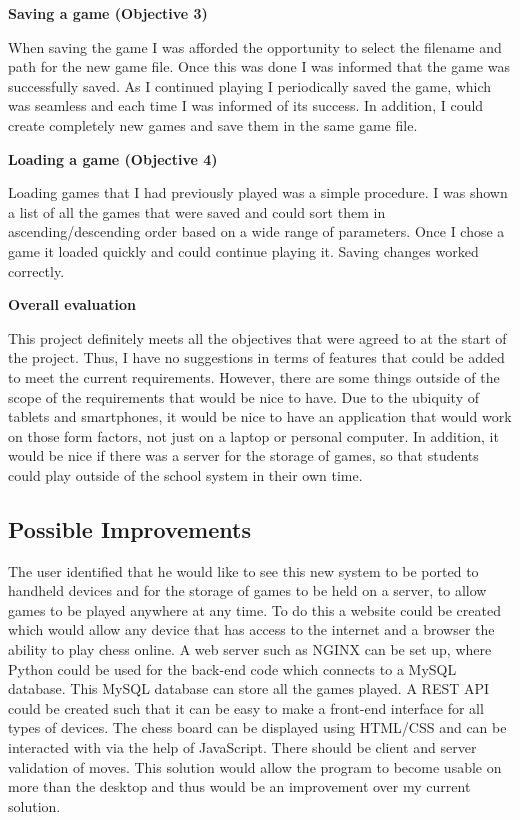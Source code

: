 \textbf{Saving a game (Objective 3)}

When saving the game I was afforded the opportunity to select the filename and path for the new game file. Once this was done I was informed that the game was successfully saved. As I continued playing I periodically saved the game, which was seamless and each time I was informed of its success. In addition, I could create completely new games and save them in the same game file.

\textbf{Loading a game (Objective 4)}

Loading games that I had previously played was a simple procedure. I was shown a list of all the games that were saved and could sort them in ascending/descending order based on a wide range of parameters. Once I chose a game it loaded quickly and could continue playing it. Saving changes worked correctly.

\textbf{Overall evaluation}

This project definitely meets all the objectives that were agreed to at the start of the project. Thus, I have no suggestions in terms of features that could be added to meet the current requirements. However, there are some things outside of the scope of the requirements that would be nice to have. Due to the ubiquity of tablets and smartphones, it would be nice to have an application that would work on those form factors, not just on a laptop or personal computer. In addition, it would be nice if there was a server for the storage of games, so that students could play outside of the school system in their own time.
\subsection{Possible Improvements}
The user identified that he would like to see this new system to be ported to handheld devices and for the storage of games to be held on a server, to allow games to be played anywhere at any time. To do this a website could be created which would allow any device that has access to the internet and a browser the ability to play chess online. A web server such as NGINX can be set up, where Python could be used for the back-end code which connects to a MySQL database. This MySQL database can store all the games played. A REST API could be created such that it can be easy to make a front-end interface for all types of devices. The chess board can be displayed using HTML/CSS and can be interacted with via the help of JavaScript. There should be client and server validation of moves.  This solution would allow the program to become usable on more than the desktop and thus would be an improvement over my current solution.

